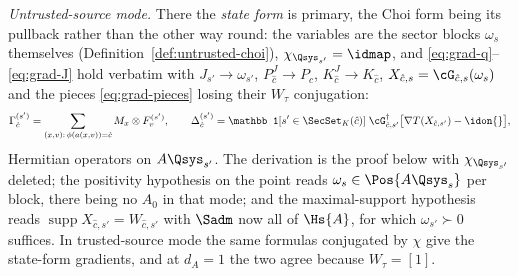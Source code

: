 \begin{corollary}
\emph{Untrusted-source mode.} There the \emph{state form} is primary,
the Choi form being its pullback rather than the other way round: the
variables are the sector blocks $\omega_{s}$ themselves
(Definition~\ref{def:untrusted-choi}), $\chi_{\Qsys_{s'}}=\idmap$, and
\eqref{eq:grad-q}--\eqref{eq:grad-J} hold verbatim with
$J_{s'}\to\omega_{s'}$, $P^{J}_{\hat c}\to P_{\hat c}$,
$K^{J}_{\hat c}\to K_{\hat c}$, $X_{\hat c,s}=\cG_{\hat c,s}(\omega_s)$
and the pieces \eqref{eq:grad-pieces} losing their $W_{\tau}$
conjugation:
\begin{equation}\label{eq:grad-pieces-un}
  \Gamma^{(s')}_{\hat c}=
  \sum_{(x,v):\,\phi(a(x,v))=\hat c} M_x\otimes F^{(s')}_v,
  \qquad
  \Delta^{(s')}_{\hat c}=
  \mathbb 1[s'\in\SecSet_K(\hat c)]\;
  \cG_{\hat c,s'}^{\dagger}\big[\nabla T(X_{\hat c,s'})-\idon{}\big],
\end{equation}
Hermitian operators on $A\Qsys_{s'}$. The derivation is the proof
below with $\chi_{\Qsys_{s'}}$ deleted; the positivity hypothesis on the
point reads $\omega_{s}\in\Pos{A\Qsys_s}$ per block, there being no $A_0$
in that mode; and the maximal-support hypothesis
reads $\operatorname{supp}X_{\hat c,s'}=W_{\hat c,s'}$ with $\Sadm$
now all of $\Hs{A}$, for which $\omega_{s'}\succ0$ suffices. In
trusted-source mode the same formulas conjugated by $\chi$ give the
state-form gradients, and at $d_A=1$ the two agree because
$W_{\tau}=[1]$.
\end{corollary}


